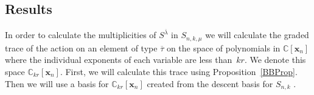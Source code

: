 \documentclass[ALCO,ThmDefs,Unicode,epreuves]{cedram}
\begin{document}
\subsection{Results}

	In order to calculate the multiplicities of $S^{\overline{\lambda}}$ in $S_{n,k,\mu}$ we will calculate the graded trace 
of the action on an element of type $\overline{\tau}$ on the space of polynomials in $\mathbb{C}[\mathbf{x}_n]$ where the 
individual exponents of each variable are less than~$kr$. We denote this space $\mathbb{C}_{kr}[\mathbf{x}_n]$. First, 
we will calculate this trace using Proposition~\ref{BBProp}. Then we will use a basis for 
$\mathbb{C}_{kr}[\mathbf{x}_n]$ created from the descent basis for $S_{n,k}$ .
\end{document}

